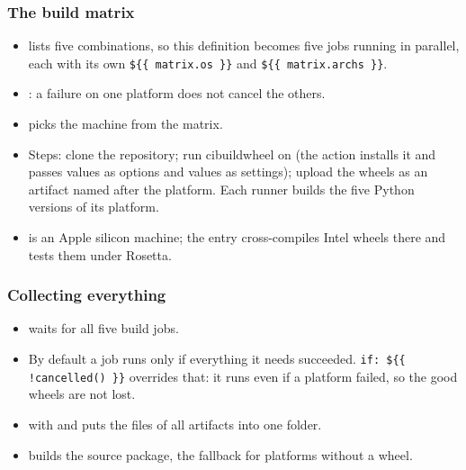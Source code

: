 \subsubsection{The build matrix}
\begin{itemize}
  \item {} lists five combinations, so this definition becomes five
        jobs running in parallel, each with its own \lstinline|${{ matrix.os }}| and
        \lstinline|${{ matrix.archs }}|.
  \item {}: a failure on one platform does not cancel the others.
  \item {} picks the machine from the matrix.
  \item Steps: clone the repository; run cibuildwheel on  (the action installs it and
        passes  values as options and  values as  settings);
        upload the wheels as an artifact named after the platform. Each runner builds the five
        Python versions of its platform.
  \item {} is an Apple silicon machine; the  entry cross-compiles Intel
        wheels there and tests them under Rosetta.
\end{itemize}

\subsubsection{Collecting everything}
\begin{itemize}
  \item {} waits for all five build jobs.
  \item By default a job runs only if everything it needs succeeded. \lstinline|if: ${{ !cancelled() }}|
        overrides that: it runs even if a platform failed, so the good wheels are not lost.
  \item {} with  and  puts the files of all
         artifacts into one folder.
  \item {} builds the source package, the fallback for platforms without
        a wheel.
\end{itemize}

